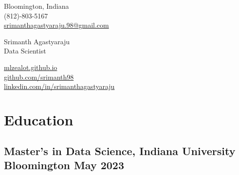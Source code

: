 \documentclass[a4,10pt]{article}
\begin{document}
\begin{center}
    \begin{minipage}[b]{0.24\textwidth}
            \small Bloomington, Indiana \\
            \small (812)-803-5167 \\
            \small \href{mailto:srimanthagastyaraju.98@gmail.com}{srimanthagastyaraju.98@gmail.com}
    \end{minipage}%
    \begin{minipage}[b]{0.5\textwidth}
            \centering
            {\HUGE Srimanth Agastyaraju} \\ %
            \vspace{0.1cm}
            {\color{UI_blue} \Large{Data Scientist}} \\
    \end{minipage}%
    \begin{minipage}[b]{0.24\textwidth}
            \flushright \small  %
            {\href{https://mlzealot.github.io/}{mlzealot.github.io}} \\
            {\href{https://github.com/srimanth98}{github.com/srimanth98}} \\
            \href{https://www.linkedin.com/in/srimanthagastyaraju/}{linkedin.com/in/srimanthagastyaraju}
    \end{minipage}   
    
\vspace{-0.15cm} 
{\color{UI_blue} \hrulefill}
\end{center}


\vspace{-0.70cm} 
\section{Education }
\subsection*{Master’s in Data Science, {\normalsize \normalfont Indiana University Bloomington} \hfill May 2023} 
\vspace{0.1cm}
\end{document}
